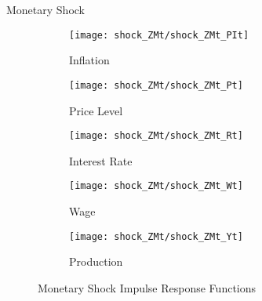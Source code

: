 \documentclass[
presentation.tex
]{subfiles}
\begin{document}
\begin{frame}{Monetary Shock}
	
	\begin{figure}[h!]
		\centering
		\begin{subfigure}[b]{0.3\textwidth}
			\centering
			\texttt{[image: shock\_ZMt/shock\_ZMt\_PIt]}
			\caption{Inflation}
			\label{fig:ZMt-inflation}
		\end{subfigure}
		\hfill
		\begin{subfigure}[b]{0.3\textwidth}
			\centering
			\texttt{[image: shock\_ZMt/shock\_ZMt\_Pt]}
			\caption{Price Level}
			\label{fig:ZMt-price}
		\end{subfigure}
		\hfill
		\begin{subfigure}[b]{0.3\textwidth}
			\centering
			\texttt{[image: shock\_ZMt/shock\_ZMt\_Rt]}
			\caption{Interest Rate}
			\label{fig:ZMt-interest-rate}
		\end{subfigure}
		\hfill
		
		\vspace*{0.5cm}
		
		\hfill
		\begin{subfigure}[b]{0.3\textwidth}
			\centering
			\texttt{[image: shock\_ZMt/shock\_ZMt\_Wt]}
			\caption{Wage}
			\label{fig:ZMt-wage}
		\end{subfigure}
		\hfill
		\begin{subfigure}[b]{0.3\textwidth}
			\centering
			\texttt{[image: shock\_ZMt/shock\_ZMt\_Yt]}
			\caption{Production}
			\label{fig:ZMt-production}
		\end{subfigure}
		\hfill
		\hfill
		\caption{Monetary Shock Impulse Response Functions}
		\label{fig:ZMt-irf}
	\end{figure}
	
\end{frame}
\end{document}
